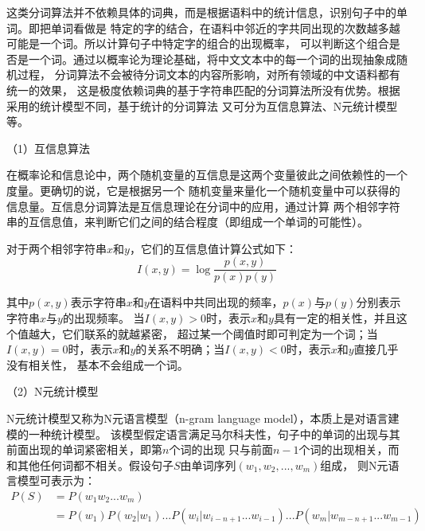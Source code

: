 \documentclass{standalone}
\begin{document}
这类分词算法并不依赖具体的词典，而是根据语料中的统计信息，识别句子中的单词。即把单词看做是
特定的字的结合，在语料中邻近的字共同出现的次数越多越可能是一个词。所以计算句子中特定字的组合的出现概率，
可以判断这个组合是否是一个词。通过以概率论为理论基础，将中文文本中的每一个词的出现抽象成随机过程，
分词算法不会被待分词文本的内容所影响，对所有领域的中文语料都有统一的效果，
这是极度依赖词典的基于字符串匹配的分词算法所没有优势。根据采用的统计模型不同，基于统计的分词算法
又可分为互信息算法、N元统计模型等。

（1）互信息算法

在概率论和信息论中，两个随机变量的互信息是这两个变量彼此之间依赖性的一个度量。更确切的说，它是根据另一个
随机变量来量化一个随机变量中可以获得的信息量。互信息分词算法是互信息理论在分词中的应用，通过计算
两个相邻字符串的互信息值，来判断它们之间的结合程度（即组成一个单词的可能性）。

对于两个相邻字符串$x$和$y$，它们的互信息值计算公式如下：
\begin{equation}
    I\left ( x,y \right )=\log \frac{p\left ( x,y \right )}{p\left ( x \right )p\left ( y \right )}
\end{equation}

其中$p\left ( x,y \right )$表示字符串$x$和$y$在语料中共同出现的频率，$p\left ( x \right )$与$p\left ( y \right )$分别表示字符串$x$与$y$的出现频率。
当$I\left ( x,y \right )>0$时，表示$x$和$y$具有一定的相关性，并且这个值越大，它们联系的就越紧密，
超过某一个阈值时即可判定为一个词；当$I\left ( x,y \right )=0$时，表示$x$和$y$的关系不明确；当$I\left ( x,y \right )<0$时，表示$x$和$y$直接几乎没有相关性，
基本不会组成一个词。

（2）N元统计模型

N元统计模型又称为N元语言模型（n-gram language model），本质上是对语言建模的一种统计模型。
该模型假定语言满足马尔科夫性，句子中的单词的出现与其前面出现的单词紧密相关，即第$n$个词的出现
只与前面$n-1$个词的出现相关，而和其他任何词都不相关。假设句子$S$由单词序列$\left (w_1,w_2,...,w_m  \right )$组成，
则N元语言模型可表示为：
\begin{equation}
    \begin{aligned}
        P\left ( S \right )&=P\left ( w_1w_2...w_m \right )\\
        &=P\left ( w_1 \right )P\left ( w_2|w_1 \right )...
P\left ( w_i|w_{i-n+1}...w_{i-1} \right )...P\left ( w_m|w_{m-n+1}...w_{m-1} \right )
    \end{aligned}
    \label{n-gram}
\end{equation}
\end{document}
